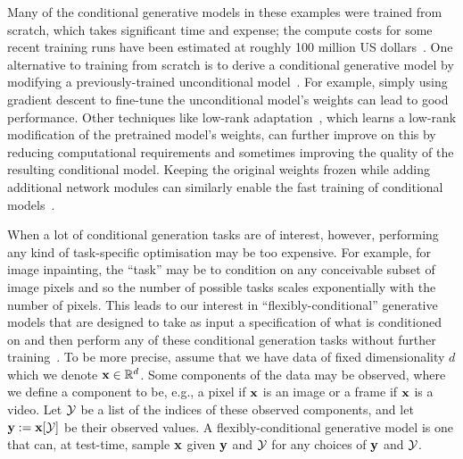 Many of the conditional generative models in these examples were trained from scratch, which takes significant time and expense; the compute costs for some recent training runs have been estimated at roughly 100 million US dollars~\citep{knight2023openai,stanford2024artificial}. One alternative to training from scratch is to derive a conditional generative model by modifying a previously-trained unconditional model~\citep{tian2023control,sheynin2023emu}. For example, simply using gradient descent to fine-tune the unconditional model's weights can lead to good performance. Other techniques like low-rank adaptation~\citep{hu2021lora}, which learns a low-rank modification of the pretrained model's weights, can further improve on this by reducing computational requirements and sometimes improving the quality of the resulting conditional model. Keeping the original weights frozen while adding additional network modules can similarly enable the fast training of conditional models~\citep{ruckle2020adapterdrop,tian2023control}.


When a lot of conditional generation tasks are of interest, however, performing any kind of task-specific optimisation may be too expensive. For example, for image inpainting, the ``task'' may be to condition on any conceivable subset of image pixels and so the number of possible tasks scales exponentially with the number of pixels. This leads to our interest in ``flexibly-conditional'' generative models that are designed to take as input a specification of what is conditioned on and then perform any of these conditional generation tasks without further training~\citep{ivanov2018variational,rombach2022high,zhao2021large,harvey2021conditional}. To be more precise, assume that we have data of fixed dimensionality $d$ which we denote ${\mathbf{x}} \in \mathbb{R}^d$. Some components of the data may be observed, where we define a component to be, e.g., a pixel if ${\mathbf{x}}$ is an image or a frame if ${\mathbf{x}}$ is a video. Let ${\mathcal{Y}}$ be a list of the indices of these observed components, and let ${\mathbf{y}} := {\mathbf{x}}[{\mathcal{Y}}]$ be their observed values. A flexibly-conditional generative model is one that can, at test-time, sample ${\mathbf{x}}$ given ${\mathbf{y}}$ and ${\mathcal{Y}}$ for any choices of ${\mathbf{y}}$ and ${\mathcal{Y}}$.


